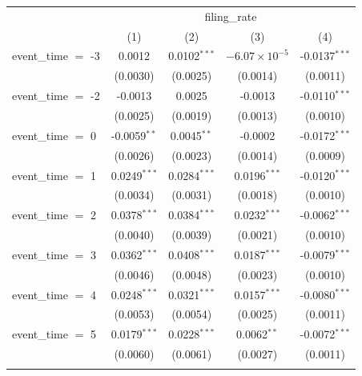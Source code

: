 
\begingroup
\centering
\begin{tabular}{lcccc}
   \toprule
    & \multicolumn{4}{c}{filing\_rate}\\
                       & (1)            & (2)            & (3)                    & (4)\\  
   \midrule 
   event\_time $=$ -3  & 0.0012         & 0.0102$^{***}$ & $-6.07\times 10^{-5}$  & -0.0137$^{***}$\\   
                       & (0.0030)       & (0.0025)       & (0.0014)               & (0.0011)\\   
   event\_time $=$ -2  & -0.0013        & 0.0025         & -0.0013                & -0.0110$^{***}$\\   
                       & (0.0025)       & (0.0019)       & (0.0013)               & (0.0010)\\   
   event\_time $=$ 0   & -0.0059$^{**}$ & 0.0045$^{**}$  & -0.0002                & -0.0172$^{***}$\\   
                       & (0.0026)       & (0.0023)       & (0.0014)               & (0.0009)\\   
   event\_time $=$ 1   & 0.0249$^{***}$ & 0.0284$^{***}$ & 0.0196$^{***}$         & -0.0120$^{***}$\\   
                       & (0.0034)       & (0.0031)       & (0.0018)               & (0.0010)\\   
   event\_time $=$ 2   & 0.0378$^{***}$ & 0.0384$^{***}$ & 0.0232$^{***}$         & -0.0062$^{***}$\\   
                       & (0.0040)       & (0.0039)       & (0.0021)               & (0.0010)\\   
   event\_time $=$ 3   & 0.0362$^{***}$ & 0.0408$^{***}$ & 0.0187$^{***}$         & -0.0079$^{***}$\\   
                       & (0.0046)       & (0.0048)       & (0.0023)               & (0.0010)\\   
   event\_time $=$ 4   & 0.0248$^{***}$ & 0.0321$^{***}$ & 0.0157$^{***}$         & -0.0080$^{***}$\\   
                       & (0.0053)       & (0.0054)       & (0.0025)               & (0.0011)\\   
   event\_time $=$ 5   & 0.0179$^{***}$ & 0.0228$^{***}$ & 0.0062$^{**}$          & -0.0072$^{***}$\\   
                       & (0.0060)       & (0.0061)       & (0.0027)               & (0.0011)\\   
    \\

\end{tabular}
